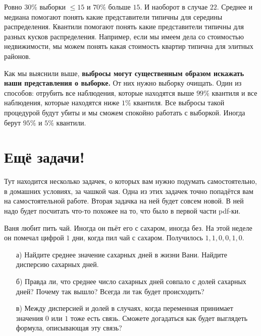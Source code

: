 \documentclass[12pt, a4paper, oneside]{article}
\theoremstyle{plain} %
\theoremstyle{definition}
\newcounter{problem}%
\renewcommand{\theproblem}{\arabic{problem}}
\newenvironment{problem}{
\addtocounter{problem}{1}\noindent{ \color{titleblue} \large \bfseries Упражнение~\theproblem \vspace{1ex} \newline}
}{ }
\newcommand{\indef}[1]{\textbf{ \color{green} #1}}
\begin{document}
\begin{solution}
\begin{enumerate}
	Ровно $30\%$ выборки $ \le 15$ и $70\%$ больше $15$. И наоборот в случае $22$. Среднее и медиана помогают понять какие представители типичны для середины распределения. Квантили помогают понять какие представители типичны для разных кусков распределения. Например, если мы имеем дела со стоимостью недвижимости, мы можем понять какая стоимость квартир типична для элитных районов. 

	Как мы выяснили выше, \indef{выбросы могут существенным образом искажать наши представления о выборке.} От них нужно выборку очищать. Один из способов: отрубить все наблюдения, которые находятся выше $99\%$ квантиля и все наблюдения, которые находятся ниже $1\%$ квантиля. Все выбросы такой процедурой будут убиты и мы сможем спокойно работать с выборкой. Иногда берут $95\%$ и $5\%$ квантили. 
\end{enumerate}
\end{solution}



\section*{Ещё задачи!} 

Тут находится несколько задачек, о которых вам нужно подумать самостоятельно, в домашних условиях, за чашкой чая. Одна из этих задачек точно попадётся вам на самостоятельной работе. Вторая задачка на ней будет совсем новой. В ней надо будет посчитать что-то похожее на то, что было в первой части pdf-ки.

\begin{problem} 
Ваня любит пить чай. Иногда он пьёт его с сахаром, иногда без. На этой неделе он помечал цифрой $1$ дни, когда пил чай с сахаром. Получилось $1,1,0,0,1,0$.  

\begin{enumerate}
    \item[а)] Найдите среднее значение сахарных дней в жизни Вани. Найдите дисперсию сахарных дней.
    \item[б)] Правда ли, что среднее число сахарных дней совпало с долей сахарных дней? Почему так вышло? Всегда ли так будет происходить?
    \item[в)] Между дисперсией и долей в случаях, когда переменная принимает значения $0$ или $1$ тоже есть связь. Сможете догадаться как будет выглядеть формула, описывающая эту связь? 
\end{enumerate}
\end{problem} 
\end{document}
